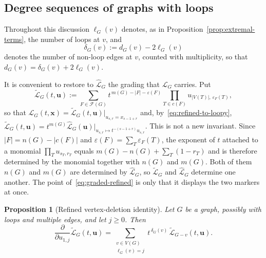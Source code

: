 \documentclass[11pt]{article}
\theoremstyle{plain}
\newtheorem{proposition}[theorem]{Proposition}
\theoremstyle{definition}
\renewcommand{\mathcal}{\mathscr}
\newcommand{\LL}{\mathcal{L}}    %
\newcommand{\cF}{\mathcal{F}}    %
\newcommand{\bu}{\mathbf{u}}
\newcommand{\bx}{\mathbf{x}}
\newcommand{\eps}{\varepsilon}
\numberwithin{equation}{section}
\begin{document}
\subsection{Degree sequences of graphs with loops}\label{subsec:degree-loops}


Throughout this discussion $\ell_G(v)$ denotes, as in
Proposition~\ref{prop:extremal-terms}, the number of loops at $v$, and
\[
   \delta_G(v):=d_{G}(v)-2\ell_G(v)
\]
denotes the number of non-loop edges at $v$, counted with multiplicity, so
that $d_G(v)=\delta_G(v)+2\ell_G(v)$.

It is convenient to restore to $\widehat{\LL}_G$ the grading that
$\LL_G$ carries.  Put
\begin{equation}\label{eq:graded-refined}
   \widetilde{\LL}_G(t,\bu)
   :=
   \sum_{F\in\cF(G)}
      t^{\,m(G)-|F|-\eps(F)}
      \prod_{T\in c(F)}u_{|V(T)|,\,\eps_F(T)} ,
\end{equation}
so that $\LL_G(t,\bx)=\widetilde{\LL}_G(t,\bu)\big|_{u_{s,r}=x_{s-1+r}}$
and, by~\eqref{eq:refined-to-loopy},
$\widetilde{\LL}_G(t,\bu)=t^{m(G)}\widehat{\LL}_G(\bu)
 \big|_{u_{s,r}\mapsto t^{-(s-1+r)}u_{s,r}}$.
This is not a new invariant.  Since $|F|=n(G)-|c(F)|$ and
$\eps(F)=\sum_{T}\eps_F(T)$, the exponent of $t$ attached to a
monomial $\prod_{T}u_{s_T,r_T}$ equals
$m(G)-n(G)+\sum_{T}(1-r_T)$ and is therefore determined by the monomial
together with $n(G)$ and $m(G)$. Both of them$n(G)$ and $m(G)$ are determined by
$\widehat{\LL}_G$, so $\widetilde{\LL}_G$ and $\widehat{\LL}_G$ determine one
another.  The point of~\eqref{eq:graded-refined} is only that it displays the
two markers at once.

\begin{proposition}[Refined vertex-deletion identity]
\label{prop:refined-vertex-deletion}
Let $G$ be a graph, possibly with loops and multiple edges, and let $j\ge 0$.
Then
\begin{equation}\label{eq:refined-vertex-deletion}
   \frac{\partial}{\partial u_{1,j}}\widetilde{\LL}_G(t,\bu)
   =
   \sum_{\substack{v\in V(G)\\ \ell_G(v)=j}}
      t^{\,\delta_G(v)}\,\widetilde{\LL}_{G-v}(t,\bu).
\end{equation}
\end{proposition}
\end{document}
